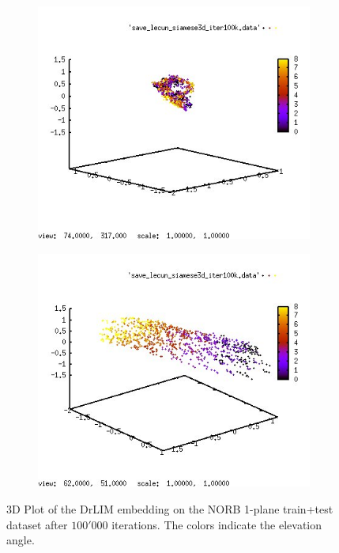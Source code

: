 \documentclass[a4paper,12pt]{report}
\begin{document}
\begin{figure}[h]
    \centering
    \begin{subfigure}{0.45\textwidth}
        \centering
        \includegraphics[width=\textwidth]{thesis_figures/norb_drlim1.jpg}
    \end{subfigure}
    \begin{subfigure}{0.45\textwidth}
        \centering
        \includegraphics[width=\textwidth]{thesis_figures/norb_drlim2.jpg}
    \end{subfigure}
    \caption{3D Plot of the DrLIM embedding on the NORB 1-plane train+test dataset after $100'000$ iterations. The colors indicate the elevation angle.}
    \label{fig:norb_drlim_embedding}
\end{figure}
\end{document}
